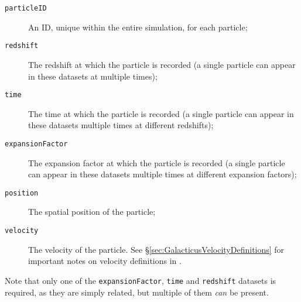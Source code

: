 \begin{description}
 \item [{\tt particleID}] An ID, unique within the entire simulation, for each particle;
 \item [{\tt redshift}] The redshift at which the particle is recorded (a single particle can appear in these datasets at multiple times);
 \item [{\tt time}] The time at which the particle is recorded (a single particle can appear in these datasets multiple times at different redshifts);
 \item [{\tt expansionFactor}] The expansion factor at which the particle is recorded (a single particle can appear in these datasets multiple times at different expansion factors);
 \item [{\tt position}] The spatial position of the particle;
 \item [{\tt velocity}] The velocity of the particle. See \S\ref{sec:GalacticusVelocityDefinitions} for important notes on velocity definitions in \glc.
\end{description}

Note that only one of the {\tt expansionFactor}, {\tt time} and {\tt redshift} datasets is required, as they are simply related, but multiple of them \emph{can} be present.
